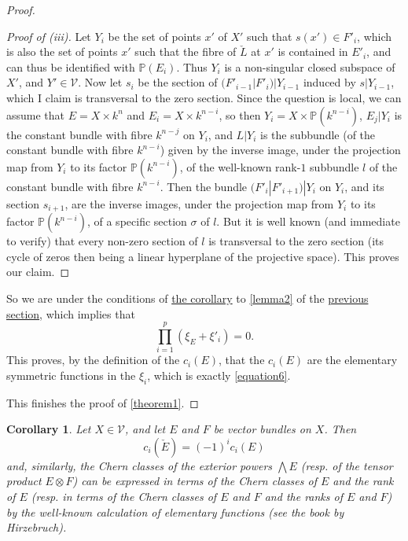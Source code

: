 \documentclass{article}
\theoremstyle{plain}
\newtheorem*{corollary}{Corollary}
\theoremstyle{definition}
\newcommand{\cat}[1]{{\mathcal{#1}}}
\newcommand{\oldpage}[1]{\marginpar{\footnotesize$\Big\vert$ \textit{p.~#1}}}
\begin{document}
\begin{proof}
\begin{proof}[Proof of \rm{(iii)}]
    Let $Y_i$ be the set of points $x'$ of $X'$ such that $s(x')\in F'_i$, which is also the set of points $x'$ such that the fibre of $\check{L}$ at $x'$ is contained in $E'_i$, and can thus be identified with $\mathbb{P}(E_i)$.
    Thus $Y_i$ is a non-singular closed subspace of $X'$, and $Y'\in\cat{V}$.
    Now let $s_i$ be the section of $(F'_{i-1}|F'_i)|Y_{i-1}$ induced by $s|Y_{i-1}$, which I claim is transversal to the zero section.
    Since the question is local, we
\oldpage{147}
    can assume that $E=X\times k^n$ and $E_i=X\times k^{n-i}$, so then $Y_i=X\times\mathbb{P}(k^{n-i})$, $E_j|Y_i$ is the constant bundle with fibre $k^{n-j}$ on $Y_i$, and $L|Y_i$ is the subbundle (of the constant bundle with fibre $k^{n-i}$) given by the inverse image, under the projection map from $Y_i$ to its factor $\mathbb{P}(k^{n-i})$, of the well-known rank-$1$ subbundle $l$ of the constant bundle with fibre $k^{n-i}$.
    Then the bundle $(F'_i|F'_{i+1})|Y_i$ on $Y_i$, and its section $s_{i+1}$, are the inverse images, under the projection map from $Y_i$ to its factor $\mathbb{P}(k^{n-i})$, of a specific section $\sigma$ of $l$.
    But it is well known (and immediate to verify) that every non-zero section of $l$ is transversal to the zero section (its cycle of zeros then being a linear hyperplane of the projective space).
    This proves our claim.
  \end{proof}

  So we are under the conditions of \hyperref[lemma2corollary]{the corollary} to \cref{lemma2} of the \hyperref[section2]{previous section}, which implies that
  \[
    \prod_{i=1}^p (\xi_E+\xi'_i) = 0.
  \]
  This proves, by the definition of the $c_i(E)$, that the $c_i(E)$ are the elementary symmetric functions in the $\xi_i$, which is exactly \cref{equation6}.

  This finishes the proof of \cref{theorem1}.
\end{proof}

\begin{corollary}
\label{theorem1corollary}
  Let $X\in\cat{V}$, and let $E$ and $F$ be vector bundles on $X$.
  Then
  \[
  \label{equation7}
    c_i(\check{E}) = (-1)^i c_i(E)
  \tag{7}
  \]
  and, similarly, the Chern classes of the exterior powers $\bigwedge E$ (resp. of the tensor product $E\otimes F$) can be expressed in terms of the Chern classes of $E$ and the rank of $E$ (resp. in terms of the Chern classes of $E$ and $F$ and the ranks of $E$ and $F$) by the well-known calculation of elementary functions (see the book by Hirzebruch).
\end{corollary}
\end{document}
